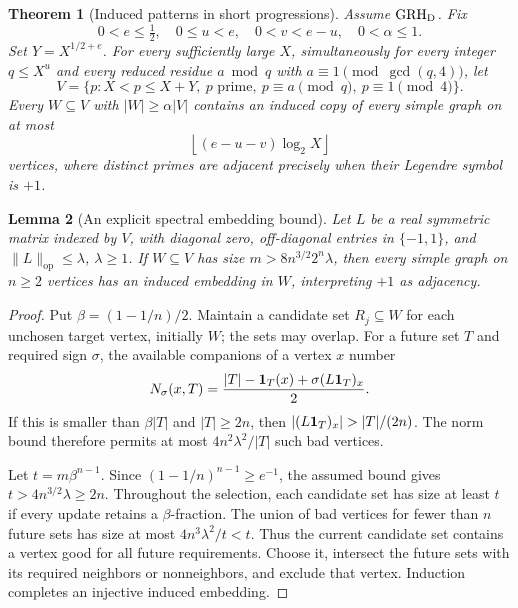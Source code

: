 \documentclass[11pt,a4paper]{article}
\newtheorem{theorem}{Theorem}[section]
\newtheorem{lemma}[theorem]{Lemma}
\theoremstyle{definition}
\theoremstyle{remark}
\begin{document}
\begin{theorem}[Induced patterns in short progressions]\label{p-thm:graphs}
Assume $\mathrm{GRH}_{\mathrm D}$. Fix
\[
 0<e\le\tfrac12,\quad 0\le u<e,\quad
 0<v<e-u,\quad 0<\alpha\le1.
\]
Set $Y=X^{1/2+e}$. For every sufficiently large $X$, simultaneously
for every integer $q\le X^u$ and every reduced residue $a\bmod q$
with $a\equiv1\pmod{\gcd(q,4)}$, let
\[
 V=\{p:X<p\le X+Y,\ p\text{ prime},\ p\equiv a\pmod q,
                  \ p\equiv1\pmod4\}.
\]
Every $W\subseteq V$ with $|W|\ge\alpha|V|$ contains an induced copy
of every simple graph on at most
\[
 \left\lfloor(e-u-v)\log_2X\right\rfloor
\]
vertices, where distinct primes are adjacent precisely when their
Legendre symbol is $+1$.
\end{theorem}

\begin{lemma}[An explicit spectral embedding bound]\label{p-lem:embedding}
Let $L$ be a real symmetric matrix indexed by $V$, with diagonal zero,
off-diagonal entries in $\{-1,1\}$, and $\|L\|_{\mathrm{op}}\le\lambda$,
$\lambda\ge1$. If $W\subseteq V$ has size
$m>8n^{3/2}2^n\lambda$, then every simple graph on $n\ge2$ vertices
has an induced embedding in $W$, interpreting $+1$ as adjacency.
\end{lemma}
\begin{proof}
Put $\beta=(1-1/n)/2$. Maintain a candidate set $R_j\subseteq W$ for
each unchosen target vertex, initially $W$; the sets may overlap.
For a future set $T$ and required sign $\sigma$, the available companions
of a vertex $x$ number
\[
 N_\sigma(x,T)=
 \frac{|T|-\mathbf 1_T(x)+\sigma(L\mathbf 1_T)_x}{2}.
\]
If this is smaller than $\beta|T|$ and $|T|\ge2n$, then
$|(L\pone_T)_x|>|T|/(2n)$. The norm bound therefore permits at most
$4n^2\lambda^2/|T|$ such bad vertices.

Let $t=m\beta^{n-1}$. Since
$(1-1/n)^{n-1}\ge e^{-1}$, the assumed bound gives
$t>4n^{3/2}\lambda\ge2n$. Throughout the selection, each candidate
set has size at least $t$ if every update retains a $\beta$-fraction.
The union of bad vertices for fewer than $n$ future sets has size at
most $4n^3\lambda^2/t<t$. Thus the current candidate set contains a
vertex good for all future requirements. Choose it, intersect the
future sets with its required neighbors or nonneighbors, and exclude
that vertex. Induction completes an injective induced embedding.
\end{proof}
\end{document}
